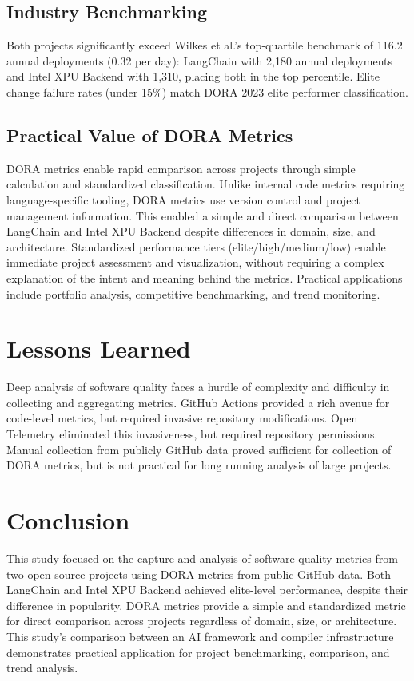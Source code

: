 \documentclass[12pt]{article}
\begin{document}
\subsection{Industry Benchmarking}
Both projects significantly exceed Wilkes et al.'s top-quartile
benchmark of 116.2 annual deployments (0.32 per day): LangChain with
2,180 annual deployments and Intel XPU Backend with 1,310, placing
both in the top percentile. Elite change failure rates (under 15\%)
match DORA 2023 elite performer classification.

\subsection{Practical Value of DORA Metrics}
DORA metrics enable rapid comparison across projects through simple
calculation and standardized classification. Unlike internal code
metrics requiring language-specific tooling, DORA metrics use version control
and project management information. This enabled a simple and direct comparison
between LangChain and Intel XPU Backend despite differences in domain, size, and
architecture. Standardized performance tiers
(elite/high/medium/low) enable immediate project assessment and
visualization, without requiring
a complex explanation of the intent and meaning behind the metrics.
Practical applications include portfolio
analysis, competitive benchmarking, and trend monitoring.

\section{Lessons Learned}

Deep analysis of software quality faces a hurdle of complexity and difficulty in
collecting and aggregating metrics. GitHub Actions provided a rich avenue for
code-level metrics, but required invasive repository modifications.
Open Telemetry eliminated
this invasiveness, but required repository permissions. Manual
collection from publicly
GitHub data proved sufficient for collection of DORA metrics, but is
not practical for long
running analysis of large projects.

\section{Conclusion}

This study focused on the capture and analysis of software quality metrics from
two open source projects using DORA metrics from public GitHub data.
Both LangChain
and Intel XPU Backend achieved elite-level performance, despite their
difference in
popularity. DORA metrics provide a simple and standardized metric for
direct comparison
across projects regardless of domain, size, or architecture. This study's
comparison between an AI framework and compiler infrastructure demonstrates
practical application for project benchmarking, comparison, and trend analysis.
\end{document}
